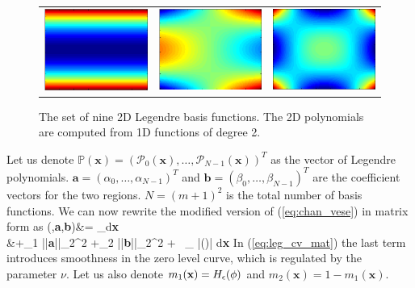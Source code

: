\begin{figure}[ht]
\begin{tabular}{@{}ccc @{}}
	\includegraphics[width=.3\textwidth]{./images/Bases_color/7}  &
	\includegraphics[width=.3\textwidth]{./images/Bases_color/8}  &
	\includegraphics[width=.3\textwidth]{./images/Bases_color/9} 
\end{tabular}
\caption[2D Legendre polynomials]{The set of nine 2D Legendre basis functions. The 2D polynomials are computed from 1D functions of degree 2.}
\label{fig:legendre_bases}
\end{figure}

Let us denote $\mathbb{P}(\textbf{x})=\left(\mathcal{P}_0(\textbf{x}),\ldots, \mathcal{P}_{N-1}(\textbf{x})\right)^T$ as the vector of Legendre polynomials. $\textbf{a}=\left(\alpha_0,\ldots,\alpha_{N-1} \right)^T$ and $\textbf{b}=\left(\beta_0,\ldots,\beta_{N-1} \right)^T$ are the coefficient vectors for the two regions. $N=(m+1)^2$ is the total number of basis functions. We can now rewrite the modified version of (\ref{eq:chan_vese}) in matrix form as
\bea
{}(\phi,\textbf{a},\textbf{b})&= \displaystyle\int_{\Omega}d\textbf{x} \nn \\
						    &+\lambda_1 ||\textbf{a}||_2^2  +\lambda_2 ||\textbf{b}||_2^2 + \nu\, \lint_{\Omega} |\nabla\heav(\phi)| d\textbf{x} 
\label{eq:leg_cv_mat}						  
\eea
In (\ref{eq:leg_cv_mat}) the last term introduces smoothness in the zero level curve, which is regulated by the parameter $\nu$.  Let us also denote  $m_1(\textbf{x})=H_{\epsilon}(\phi)$ and  $m_2(\textbf{x})=1-m_1(\textbf{x})$. 


